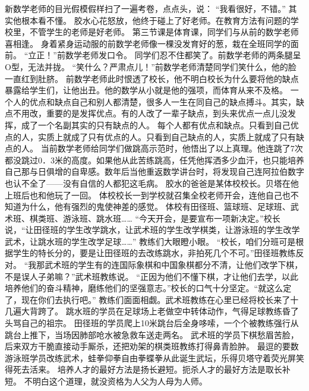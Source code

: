 \documentclass[a4paper,12pt,UTF8,twoside]{ctexbook}
\begin{document}
        新数学老师的目光假模假样扫了一遍考卷，点点头，说：  
        “我看很好，不错。”  
        其实他根本看不懂。  
        胶水心花怒放，他终于碰上了好老师。在教育方法有问题的学校里，不管学生的老师是好老师。  
        第三节课是体育课，同学们与从前的数学老师喜相逢。  
        身着紧身运动服的前数学老师像一棵没发育好的葱，栽在全班同学的面前。  
        “立正！”前数学老师发口令。  
        同学们忍不住都笑了。前数学老师的两条腿呈O型，无法并拢。  
        “笑什么？严肃点儿！”前数学老师清楚同学们笑什么，他的脸一直红到肚脐。  
        前数学老师此时恨透了校长，他不明白校长为什么要将他的缺点暴露给学生们，让他出丑。他的数学从小就是他的强项，而体育从来不及格。  
        一个人的优点和缺点自己和别人都清楚，很多人一生在同自己的缺点搏斗。其实，缺点不用改，重要的是发挥优点。有的人改了一辈子缺点，到头来优点一点儿没发挥，成了一个名副其实的只有缺点的人。  
        每个人都有优点和缺点。只看到自己优点的人，实质上就成了只有优点的人。只看到自己缺点的人，实质上就成了只有缺点的人。  
        当前数学老师给同学们做跳高示范时，他悟出了以上真理。他连跳了7次都没跳过0．3米的高度。如果他从此苦练跳高，任凭他挥洒多少血汗，也只能培养自己那与日俱增的自卑感。数年后当他重返数学讲台时，将发现自己连阿拉伯数字也认不全了——没有自信的人都犯这毛病。  
        胶水的爸爸是某体校校长。贝塔在他上班后也和他玩了一回。  
        体校校长一到学校就召集全校老师开会，连他自己也不知道为什么，他有强烈的鬼使神差的感觉。  
        体校有田径班、篮球班、足球班、武术班、棋类班、游泳班、跳水班……  
        “今天开会，是要宣布一项新决定。”校长说，“让田径班的学生改学跳水，让武术班的学生改学棋类，让游泳班的学生改学武术，让跳水班的学生改学足球……”  
        教练们大眼瞪小眼。  
        “校长，咱们分班可是根据学生的特长分的，要是让田径班的去改练跳水，非拍死几个不可。”田径班教练反对。  
        “我那武术班的学生有的连国际象棋和中国象棋都分不清，让他们改学下棋，不是误人子弟嘛？”武术班教练说。  
        “正因为他们不懂下棋，才让他们去学，以此培养他们的奋斗精神，磨练他们的坚强意志。”校长的口气十分坚定。“就这么定了，现在你们去执行吧。”  
        教练们面面相觑。武术班教练在心里已经将校长来了十几遍大背跨了。  
        跳水班的学员在足球场上老做空中转体动作，气得足球教练昏了头骂自己的祖宗。  
        田径班的学员爬上10米跳台后全身哆嗦，一个个被教练强行从跳台上推下，当场因肺部呛水被急救车送走两名。  
        武术班的学员下棋愁眉苦脸，后来双方干脆直接动手厮杀，还把劝架的棋类班教练打得鼻青脸肿。  
        最逗的要数游泳班学员改练武术，蛙拳仰拳自由拳蝶拳从此诞生武坛，乐得贝塔守着荧光屏笑得死去活来。  
        培养人才的最好方法是扬长避短。扼杀人才的最好方法是取长补短。  
        不明白这个道理，就没资格为人父为人母为人师。        
\end{document}
